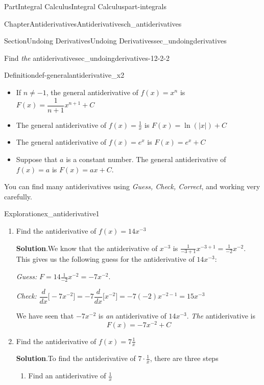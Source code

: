 \documentclass{tufte-book}
\newcommand{\blocktitlefont}{\relax}
\numberwithin{equation}{chapter}
\newcommand{\ddx}[1]{ \dfrac{d}{dx} \Big[ #1 \Big]  }
\begin{document}
\begin{partptx}{Part}{Integral Calculus}{}{Integral Calculus}{}{}{part-integrals}
\begin{chapterptx}{Chapter}{Antiderivatives}{}{Antiderivatives}{}{}{ch_antiderivatives}
\begin{sectionptx}{Section}{Undoing Derivatives}{}{Undoing Derivatives}{}{}{sec_undoingderivatives}
\begin{descriptionlist}
\begin{dlimedium}{Find \emph{the} antiderivative}{sec_undoingderivatives-12-2-2}
\end{dlimedium}%
\end{descriptionlist}
%
\begin{definition}{Definition}{}{def-generalantiderivative_x2}%
%
\begin{itemize}[label=\textbullet]
\item{}If \(n\neq -1\), the general antiderivative of \(f(x)=x^n\) is \(F(x) = \dfrac{1}{n+1}x^{n+1} + C \)%
\item{}The general antiderivative of \(f(x)=\frac{1}{x}\) is \(F(x) = \ln(|x|) + C \)%
\item{}The general antiderivative of \(f(x)=e^x\) is \(F(x) = e^x + C \)%
\item{}Suppose that \(a\) is a constant number. The general antiderivative of \(f(x)=a\) is \(F(x) = ax + C\).%
\end{itemize}
%
\end{definition}
You can find many antiderivatives using \emph{Guess, Check, Correct}, and working very carefully.%
\begin{exploration}{Exploration}{}{ex_antiderivative1}%
\begin{enumerate}[font=\bfseries,label=(\alph*),ref=\alph*]%
\item{}Find the antiderivative of \(f(x) = 14x^{-3}\)%
\par\smallskip%
\noindent\textbf{\blocktitlefont Solution}.\hypertarget{ex_antiderivative1-1-2}{}\quad{}We know that the antiderivative of \(x^{-3}\) is \(\frac{1}{-3+1}x^{-3+1} = \frac{1}{-2}x^{-2}\). This gives us the following guess for the antiderivative of \(14x^{-3}\):%
\par
\emph{Guess:} \(F = 14\frac{1}{-2}x^{-2} = -7x^{-2}\).%
\par
\emph{Check:} \(\ddx{ -7x^{-2} }= -7 \ddx{x^{-2}} = -7(-2)x^{-2-1} = 15x^{-3}\)%
\par
We have seen that \(-7x^{-2}\) is \emph{an} antiderivative of \(14x^{-3}\).  \emph{The} antiderivative is%
\begin{equation*}
F(x) = -7x^{-2} + C
\end{equation*}
%
\item{}Find the antiderivative of \(f(x) = 7\frac{1}{x}\)%
\par\smallskip%
\noindent\textbf{\blocktitlefont Solution}.\hypertarget{ex_antiderivative1-2-2}{}\quad{}To find the antiderivative of \(7\cdot\frac{1}{x}\), there are three steps%
\begin{enumerate}
\item{}Find an antiderivative of \(\frac{1}{x}\)%

\end{enumerate}
\end{enumerate}
\end{exploration}
\end{sectionptx}
\end{chapterptx}
\end{partptx}
\end{document}
